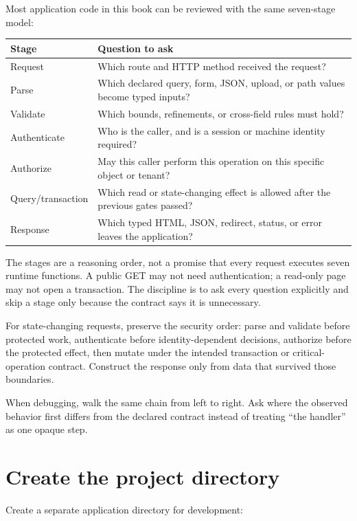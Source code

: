 Most application code in this book can be reviewed with the same seven-stage model:

\begin{center}
\begin{tabularx}{\textwidth}{@{}lY@{}}
\toprule
Stage & Question to ask \\
\midrule
Request & Which route and HTTP method received the request? \\
Parse & Which declared query, form, JSON, upload, or path values become typed inputs? \\
Validate & Which bounds, refinements, or cross-field rules must hold? \\
Authenticate & Who is the caller, and is a session or machine identity required? \\
Authorize & May this caller perform this operation on this specific object or tenant? \\
Query/transaction & Which read or state-changing effect is allowed after the previous gates passed? \\
Response & Which typed HTML, JSON, redirect, status, or error leaves the application? \\
\bottomrule
\end{tabularx}
\end{center}

The stages are a reasoning order, not a promise that every request executes seven runtime functions. A public GET may not need authentication; a read-only page may not open a transaction. The discipline is to ask every question explicitly and skip a stage only because the contract says it is unnecessary.

For state-changing requests, preserve the security order: parse and validate before protected work, authenticate before identity-dependent decisions, authorize before the protected effect, then mutate under the intended transaction or critical-operation contract. Construct the response only from data that survived those boundaries.

When debugging, walk the same chain from left to right. Ask where the observed behavior first differs from the declared contract instead of treating ``the handler'' as one opaque step.

\section{Create the project directory}

Create a separate application directory for development:

